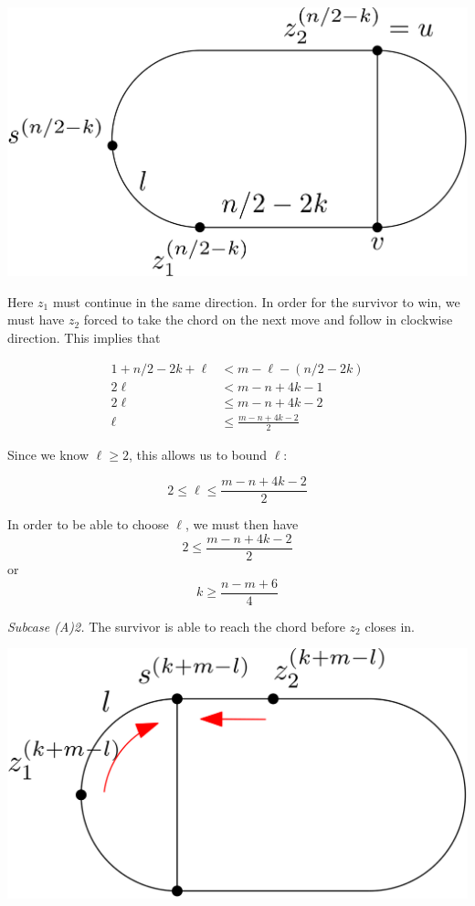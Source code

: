 \documentclass[letterpaper, 10pt]{article}
\begin{document}
\begin{enumerate}
       \begin{center}
        \includegraphics[scale=0.15]{diagramCaseA1_2}
       \end{center}

       Here $z_1$ must continue in the same direction. In order for the survivor to win, we must have
       $z_2$ forced to take the chord on the next move and follow in clockwise direction. This implies that

       \begin{align*}
        1 + n/2-2k + \ell & < m - \ell - (n/2-2k)   \\
        2\ell             & < m -n +4k -1           \\
        2\ell             & \leq m - n +4k -2       \\
        \ell              & \leq \frac{m-n+4k-2}{2}
       \end{align*}

       Since we know $\ell \geq 2$, this allows us to bound $\ell$:

       \[ 2 \leq \ell \leq \frac{m-n+4k-2}{2} \]

       In order to be able to choose $\ell$, we must then have
       \[ 2 \leq \frac{m -n + 4k -2}{2} \]
       or
       \[ k \geq \frac{n-m+6}{4} \]

       \emph{Subcase (A)2.} The survivor is able to reach the chord before $z_2$ closes in.

       \begin{center}
        \includegraphics[scale=0.15]{diagramCaseA2_1}
       \end{center}


\end{enumerate}
\end{document}
